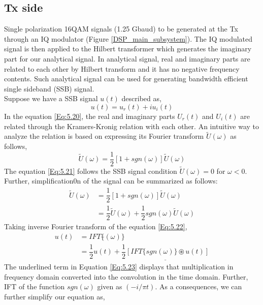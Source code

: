 \subsection{Tx side}
Single polarization 16QAM signals (1.25 Gbaud) to be generated at the Tx through an IQ modulator (Figure \ref{DSP_main_subsystem}). The IQ modulated signal is then applied to the Hilbert transformer which generates the imaginary part for our analytical signal. In analytical signal, real and imaginary parts are related to each other by Hilbert transform and it has no negative frequency contents. Such analytical signal can be used for generating bandwidth efficient single sideband (SSB) signal.\\
Suppose we have a SSB signal $u(t)$ described as,
\begin{equation}
u(t)=u_r(t)+iu_i(t)
\label{Eq:5.20}
\end{equation}
In the equation \ref{Eq:5.20}, the real and imaginary parts $U_r(t)$ and $U_i(t)$ are related through the Kramers-Kronig relation with each other. An intuitive way to analyze the relation is based on expressing its Fourier transform $\tilde{U}(\omega)$ as follows,
\begin{equation}
\tilde{U}(\omega)=\dfrac{1}{2}[1+sgn(\omega)]\tilde{U}(\omega)
\label{Eq:5.21}
\end{equation}
The equation \ref{Eq:5.21} follows the SSB signal condition $\tilde{U}(\omega)=0$ for $\omega<0$. Further, simplification0n of the signal can be summarized as follows:
\begin{equation}
\begin{split}
\tilde{U}(\omega)&=\dfrac{1}{2}[1+sgn(\omega)]\tilde{U}(\omega)\\
				 &=\dfrac{1}{2}\tilde{U}(\omega)+\dfrac{1}{2}sgn(\omega)\tilde{U}(\omega)
\end{split}
\label{Eq:5.22}
\end{equation}
Taking inverse Fourier transform of the equation \ref{Eq:5.22},
\begin{equation}
\begin{split}
	{u}(t)&=IFT\{\tilde{}(\omega)\}\\
	      &=\dfrac{1}{2}{u}(t)+\underline{\dfrac{1}{2}[IFT\{sgn(\omega)\} \circledast {u}(t)]}
\end{split}
\label{Eq:5.23}
\end{equation}
The underlined term in Equation \ref{Eq:5.23} displays that multiplication in frequency domain converted into the convolution in the time domain. Further, IFT of the function $sgn(\omega)$ given as $(-i/\pi t)$. As a consequences, we can further simplify our equation as,

